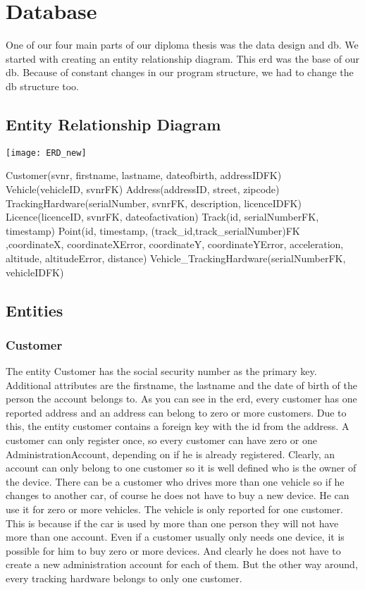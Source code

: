 \chapter{Database}
One of our four main parts of our diploma thesis was the data design and \gls{db}. We started with creating an entity relationship diagram. This \gls{erd} was the base of our \gls{db}. Because of constant changes in our program structure, we had to change the \gls{db} structure too. 
\section{Entity Relationship Diagram}
\begin{center}
\texttt{[image: ERD\_new]}
\end{center} 
Customer(svnr, firstname, lastname, dateofbirth, addressIDFK)\newline
Vehicle(vehicleID, svnrFK)\newline
Address(addressID, street, zipcode)\newline
TrackingHardware(serialNumber, svnrFK, description, licenceIDFK)\newline
Licence(licenceID, svnrFK, dateofactivation)\newline
Track(id, serialNumberFK, timestamp)\newline
Point(id, timestamp, (track\_id,track\_serialNumber)FK ,coordinateX, coordinateXError, coordinateY, coordinateYError, acceleration, altitude, altitudeError, distance)\newline
Vehicle\_TrackingHardware(serialNumberFK, vehicleIDFK)
\section{Entities}
\subsection{Customer}
The entity Customer has the social security number as the primary key. Additional attributes are the firstname, the lastname and the date of birth of the person the account belongs to. As you can see in the \gls{erd}, every customer has one reported address and an address can belong to zero or more customers. Due to this, the entity customer contains a foreign key with the id from the address. A customer can only register once, so every customer can have zero or one AdministrationAccount, depending on if he is already registered. Clearly, an account can only belong to one customer so it is well defined who is the owner of the device. There can be a customer who drives more than one vehicle so if he changes to another car, of course he does not have to buy a new device. He can use it for zero or more vehicles. The vehicle is only reported for one customer. This is because if the car is used by more than one person they will not have more than one account. Even if a customer usually only needs one device, it is possible for him to buy zero or more devices. And clearly he does not have to create a new administration account for each of them. But the other way around, every tracking hardware belongs to only one customer.
